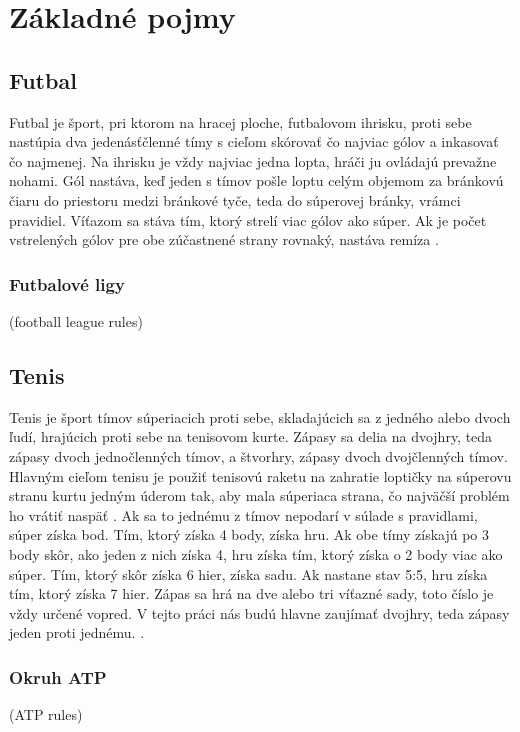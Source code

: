 \chapter{Základné pojmy}

\section{Futbal}
Futbal je šport, pri ktorom na hracej ploche, futbalovom ihrisku, proti sebe nastúpia dva jedenásťčlenné tímy s cieľom skórovať čo najviac gólov a inkasovať čo najmenej.
Na ihrisku je vždy najviac jedna lopta, hráči ju ovládajú prevažne nohami. 
Gól nastáva, keď jeden s tímov pošle loptu celým objemom za bránkovú čiaru do priestoru medzi bránkové tyče, teda do súperovej bránky, vrámci pravidiel. 
Víťazom sa stáva tím, ktorý strelí viac gólov ako súper. 
Ak je počet vstrelených gólov pre obe zúčastnené strany rovnaký, nastáva remíza 
\citep{hry1}.\\

\subsection{Futbalové ligy}
(football league rules)

\section{Tenis}
Tenis je šport tímov súperiacich proti sebe, skladajúcich sa z jedného alebo dvoch ľudí, hrajúcich proti sebe na tenisovom kurte.
Zápasy sa delia na dvojhry, teda zápasy dvoch jednočlenných tímov, a štvorhry, zápasy dvoch dvojčlenných tímov.
Hlavným cieľom tenisu je použiť tenisovú raketu na zahratie loptičky na súperovu stranu kurtu jedným úderom tak, aby mala súperiaca strana, čo najväčší problém ho vrátiť naspäť \citep{tenis:kor}. 
Ak sa to jednému z tímov nepodarí v súlade s pravidlami, súper získa bod.
Tím, ktorý získa 4 body, získa hru. Ak obe tímy získajú po 3 body skôr, ako jeden z nich získa 4, hru získa tím, ktorý získa o 2 body viac ako súper.
Tím, ktorý skôr získa 6 hier, získa sadu. Ak nastane stav 5:5, hru získa tím, ktorý získa 7 hier.
Zápas sa hrá na dve alebo tri víťazné sady, toto číslo je vždy určené vopred.
V tejto práci nás budú hlavne zaujímať dvojhry, teda zápasy jeden proti jednému.
\citep{hry2}.\\

\subsection{Okruh ATP}
(ATP rules)

